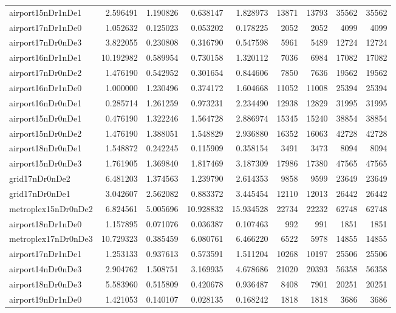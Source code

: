 \begin{longtable}{|l|r|r|r|r|r|r|r|r|}
airport15nDr1nDe1 & 2.596491 & 1.190826 & 0.638147 & 1.828973 & 13871 & 13793 & 35562 & 35562 \\
airport17nDr1nDe0 & 1.052632 & 0.125023 & 0.053202 & 0.178225 & 2052 & 2052 & 4099 & 4099 \\
airport17nDr0nDe3 & 3.822055 & 0.230808 & 0.316790 & 0.547598 & 5961 & 5489 & 12724 & 12724 \\
airport16nDr1nDe1 & 10.192982 & 0.589954 & 0.730158 & 1.320112 & 7036 & 6984 & 17082 & 17082 \\
airport17nDr0nDe2 & 1.476190 & 0.542952 & 0.301654 & 0.844606 & 7850 & 7636 & 19562 & 19562 \\
airport16nDr1nDe0 & 1.000000 & 1.230496 & 0.374172 & 1.604668 & 11052 & 11008 & 25394 & 25394 \\
airport16nDr0nDe1 & 0.285714 & 1.261259 & 0.973231 & 2.234490 & 12938 & 12829 & 31995 & 31995 \\
airport15nDr0nDe1 & 0.476190 & 1.322246 & 1.564728 & 2.886974 & 15345 & 15240 & 38854 & 38854 \\
airport15nDr0nDe2 & 1.476190 & 1.388051 & 1.548829 & 2.936880 & 16352 & 16063 & 42728 & 42728 \\
airport18nDr0nDe1 & 1.548872 & 0.242245 & 0.115909 & 0.358154 & 3491 & 3473 & 8094 & 8094 \\
airport15nDr0nDe3 & 1.761905 & 1.369840 & 1.817469 & 3.187309 & 17986 & 17380 & 47565 & 47565 \\
grid17nDr0nDe2 & 6.481203 & 1.374563 & 1.239790 & 2.614353 & 9858 & 9599 & 23649 & 23649 \\
grid17nDr0nDe1 & 3.042607 & 2.562082 & 0.883372 & 3.445454 & 12110 & 12013 & 26442 & 26442 \\
metroplex15nDr0nDe2 & 6.824561 & 5.005696 & 10.928832 & 15.934528 & 22734 & 22232 & 62748 & 62748 \\
airport18nDr1nDe0 & 1.157895 & 0.071076 & 0.036387 & 0.107463 & 992 & 991 & 1851 & 1851 \\
metroplex17nDr0nDe3 & 10.729323 & 0.385459 & 6.080761 & 6.466220 & 6522 & 5978 & 14855 & 14855 \\
airport17nDr1nDe1 & 1.253133 & 0.937613 & 0.573591 & 1.511204 & 10268 & 10197 & 25506 & 25506 \\
airport14nDr0nDe3 & 2.904762 & 1.508751 & 3.169935 & 4.678686 & 21020 & 20393 & 56358 & 56358 \\
airport18nDr0nDe3 & 5.583960 & 0.515809 & 0.420678 & 0.936487 & 8408 & 7901 & 20251 & 20251 \\
airport19nDr1nDe0 & 1.421053 & 0.140107 & 0.028135 & 0.168242 & 1818 & 1818 & 3686 & 3686 \\

\end{longtable}
